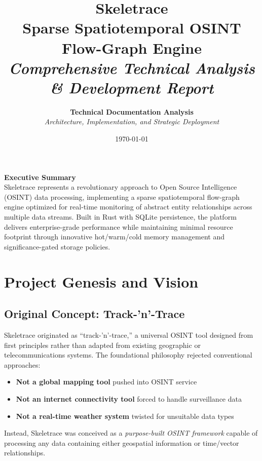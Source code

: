 \documentclass[12pt,a4paper]{article}
\title{\Huge\textbf{Skeletrace}\\
\LARGE\textcolor{osintgreen}{Sparse Spatiotemporal OSINT Flow-Graph Engine}\\
\large\textit{Comprehensive Technical Analysis \& Development Report}}
\author{\textbf{Technical Documentation Analysis}\\
\textit{Architecture, Implementation, and Strategic Deployment}}
\date{\today}
\begin{document}
\maketitle
\thispagestyle{empty}

\begin{center}
\vspace{2cm}
\begin{tcolorbox}[colback=skeletraceblue!10,colframe=skeletraceblue,width=0.8\textwidth]
\centering
\textbf{\Large Executive Summary}\\[0.5cm]
Skeletrace represents a revolutionary approach to Open Source Intelligence (OSINT) data processing, implementing a sparse spatiotemporal flow-graph engine optimized for real-time monitoring of abstract entity relationships across multiple data streams. Built in Rust with SQLite persistence, the platform delivers enterprise-grade performance while maintaining minimal resource footprint through innovative hot/warm/cold memory management and significance-gated storage policies.
\end{tcolorbox}
\end{center}

\newpage
\tableofcontents
\newpage

\section{Project Genesis and Vision}

\subsection{Original Concept: Track-'n'-Trace}
Skeletrace originated as ``track-'n'-trace,'' a universal OSINT tool designed from first principles rather than adapted from existing geographic or telecommunications systems. The foundational philosophy rejected conventional approaches:

\begin{itemize}[leftmargin=*]
\item \textbf{Not a global mapping tool} pushed into OSINT service
\item \textbf{Not an internet connectivity tool} forced to handle surveillance data
\item \textbf{Not a real-time weather system} twisted for unsuitable data types
\end{itemize}

Instead, Skeletrace was conceived as a \textit{purpose-built OSINT framework} capable of processing any data containing either geospatial information or time/vector relationships.
\end{document}
